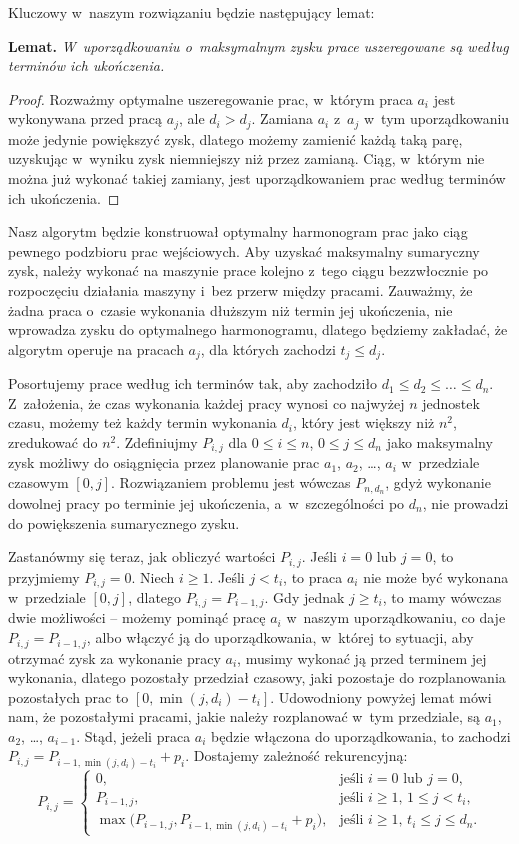 Kluczowy w~naszym rozwiązaniu będzie następujący lemat:

\medskip
\noindent\textsf{\textbf{Lemat.}} \textit{W~uporządkowaniu o~maksymalnym zysku prace uszeregowane są według terminów ich ukończenia.}
\begin{proof}
Rozważmy optymalne uszeregowanie prac, w~którym praca $a_i$ jest wykonywana przed pracą $a_j$, ale $d_i>d_j$.
Zamiana $a_i$ z~$a_j$ w~tym uporządkowaniu może jedynie powiększyć zysk, dlatego możemy zamienić każdą taką parę, uzyskując w~wyniku zysk niemniejszy niż przez zamianą.
Ciąg, w~którym nie można już wykonać takiej zamiany, jest uporządkowaniem prac według terminów ich ukończenia.
\end{proof}

Nasz algorytm będzie konstruował optymalny harmonogram prac jako ciąg pewnego podzbioru prac wejściowych.
Aby uzyskać maksymalny sumaryczny zysk, należy wykonać na maszynie prace kolejno z~tego ciągu bezzwłocznie po rozpoczęciu działania maszyny i~bez przerw między pracami.
Zauważmy, że żadna praca o~czasie wykonania dłuższym niż termin jej ukończenia, nie wprowadza zysku do optymalnego harmonogramu, dlatego będziemy zakładać, że algorytm operuje na pracach $a_j$, dla których zachodzi $t_j\le d_j$.

Posortujemy prace według ich terminów tak, aby zachodziło $d_1\le d_2\le\dots\le d_n$.
Z~założenia, że czas wykonania każdej pracy wynosi co najwyżej $n$ jednostek czasu, możemy też każdy termin wykonania $d_i$, który jest większy niż $n^2$, zredukować do $n^2$.
Zdefiniujmy $P_{i,j}$ dla $0\le i\le n$, $0\le j\le d_n$ jako maksymalny zysk możliwy do osiągnięcia przez planowanie prac $a_1$, $a_2$, \dots, $a_i$ w~przedziale czasowym $[0,j]$.
Rozwiązaniem problemu jest wówczas $P_{n,d_n}$, gdyż wykonanie dowolnej pracy po terminie jej ukończenia, a~w~szczególności po $d_n$, nie prowadzi do powiększenia sumarycznego zysku.

Zastanówmy się teraz, jak obliczyć wartości $P_{i,j}$.
Jeśli $i=0$ lub $j=0$, to przyjmiemy $P_{i,j}=0$.
Niech $i\ge1$.
Jeśli $j<t_i$, to praca $a_i$ nie może być wykonana w~przedziale $[0,j]$, dlatego $P_{i,j}=P_{i-1,j}$.
Gdy jednak $j\ge t_i$, to mamy wówczas dwie możliwości -- możemy pominąć pracę $a_i$ w~naszym uporządkowaniu, co daje $P_{i,j}=P_{i-1,j}$, albo włączyć ją do uporządkowania, w~której to sytuacji, aby otrzymać zysk za wykonanie pracy $a_i$, musimy wykonać ją przed terminem jej wykonania, dlatego pozostały przedział czasowy, jaki pozostaje do rozplanowania pozostałych prac to $[0,\min(j,d_i)-t_i]$.
Udowodniony powyżej lemat mówi nam, że pozostałymi pracami, jakie należy rozplanować w~tym przedziale, są $a_1$, $a_2$, \dots, $a_{i-1}$.
Stąd, jeżeli praca $a_i$ będzie włączona do uporządkowania, to zachodzi $P_{i,j}=P_{i-1,\min(j,d_i)-t_i}+p_i$.
Dostajemy zależność rekurencyjną:
\[
	P_{i,j} = \begin{cases}
		0, & \text{jeśli $i=0$ lub $j=0$}, \\
		P_{i-1,j}, & \text{jeśli $i\ge1$, $1\le j<t_i$}, \\
		\max\bigl(P_{i-1,j},P_{i-1,\min(j,d_i)-t_i}+p_i\bigr), & \text{jeśli $i\ge1$, $t_i\le j\le d_n$}.
	\end{cases}
\]

